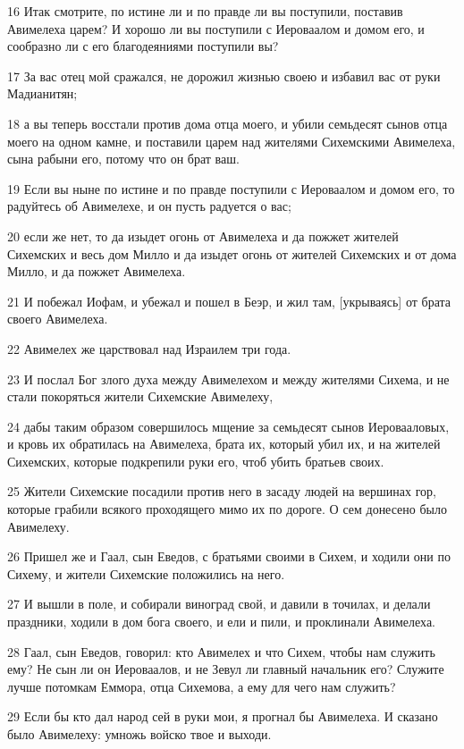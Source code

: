 \par 16 Итак смотрите, по истине ли и по правде ли вы поступили, поставив Авимелеха царем? И хорошо ли вы поступили с Иероваалом и домом его, и сообразно ли с его благодеяниями поступили вы?
\par 17 За вас отец мой сражался, не дорожил жизнью своею и избавил вас от руки Мадианитян;
\par 18 а вы теперь восстали против дома отца моего, и убили семьдесят сынов отца моего на одном камне, и поставили царем над жителями Сихемскими Авимелеха, сына рабыни его, потому что он брат ваш.
\par 19 Если вы ныне по истине и по правде поступили с Иероваалом и домом его, то радуйтесь об Авимелехе, и он пусть радуется о вас;
\par 20 если же нет, то да изыдет огонь от Авимелеха и да пожжет жителей Сихемских и весь дом Милло и да изыдет огонь от жителей Сихемских и от дома Милло, и да пожжет Авимелеха.
\par 21 И побежал Иофам, и убежал и пошел в Беэр, и жил там, [укрываясь] от брата своего Авимелеха.
\par 22 Авимелех же царствовал над Израилем три года.
\par 23 И послал Бог злого духа между Авимелехом и между жителями Сихема, и не стали покоряться жители Сихемские Авимелеху,
\par 24 дабы таким образом совершилось мщение за семьдесят сынов Иеровааловых, и кровь их обратилась на Авимелеха, брата их, который убил их, и на жителей Сихемских, которые подкрепили руки его, чтоб убить братьев своих.
\par 25 Жители Сихемские посадили против него в засаду людей на вершинах гор, которые грабили всякого проходящего мимо их по дороге. О сем донесено было Авимелеху.
\par 26 Пришел же и Гаал, сын Еведов, с братьями своими в Сихем, и ходили они по Сихему, и жители Сихемские положились на него.
\par 27 И вышли в поле, и собирали виноград свой, и давили в точилах, и делали праздники, ходили в дом бога своего, и ели и пили, и проклинали Авимелеха.
\par 28 Гаал, сын Еведов, говорил: кто Авимелех и что Сихем, чтобы нам служить ему? Не сын ли он Иероваалов, и не Зевул ли главный начальник его? Служите лучше потомкам Еммора, отца Сихемова, а ему для чего нам служить?
\par 29 Если бы кто дал народ сей в руки мои, я прогнал бы Авимелеха. И сказано было Авимелеху: умножь войско твое и выходи.
